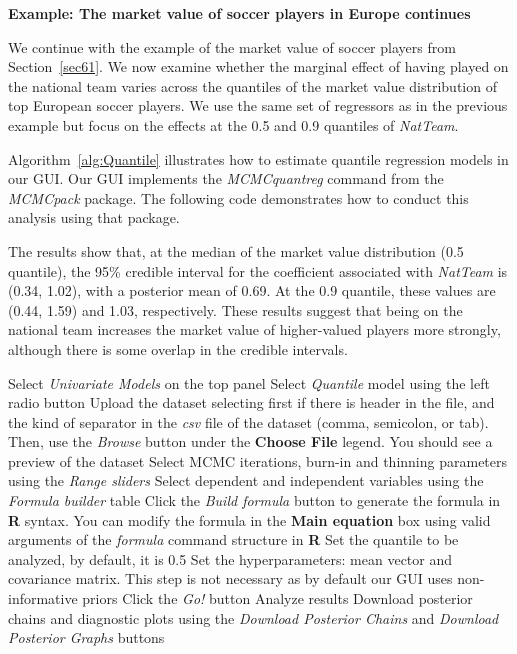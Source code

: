 \textbf{Example: The market value of soccer players in Europe continues}

We continue with the example of the market value of soccer players from Section~\ref{sec61}. We now examine whether the marginal effect of having played on the national team varies across the quantiles of the market value distribution of top European soccer players. We use the same set of regressors as in the previous example but focus on the effects at the 0.5 and 0.9 quantiles of \textit{NatTeam}.

Algorithm~\ref{alg:Quantile} illustrates how to estimate quantile regression models in our GUI. Our GUI implements the \textit{MCMCquantreg} command from the \textit{MCMCpack} package. The following code demonstrates how to conduct this analysis using that package.

The results show that, at the median of the market value distribution (0.5 quantile), the 95\% credible interval for the coefficient associated with \textit{NatTeam} is (0.34, 1.02), with a posterior mean of 0.69. At the 0.9 quantile, these values are (0.44, 1.59) and 1.03, respectively. These results suggest that being on the national team increases the market value of higher-valued players more strongly, although there is some overlap in the credible intervals.

\begin{algorithm}[h!]
	\caption{Quantile regression}\label{alg:Quantile}
	\begin{algorithmic}[1]  		 			
		\State Select \textit{Univariate Models} on the top panel
		\State Select \textit{Quantile} model using the left radio button
		\State Upload the dataset selecting first if there is header in the file, and the kind of separator in the \textit{csv} file of the dataset (comma, semicolon, or tab). Then, use the \textit{Browse} button under the \textbf{Choose File} legend. You should see a preview of the dataset
		\State Select MCMC iterations, burn-in and thinning parameters using the \textit{Range sliders}
		\State Select dependent and independent variables using the \textit{Formula builder} table
		\State Click the \textit{Build formula} button to generate the formula in \textbf{R} syntax. You can modify the formula in the \textbf{Main equation} box using valid arguments of the \textit{formula} command structure in \textbf{R}
		\State Set the quantile to be analyzed, by default, it is 0.5
		\State Set the hyperparameters: mean vector and covariance matrix. This step is not necessary as by default our GUI uses non-informative priors
		\State Click the \textit{Go!} button
		\State Analyze results
		\State Download posterior chains and diagnostic plots using the \textit{Download Posterior Chains} and \textit{Download Posterior Graphs} buttons
	\end{algorithmic} 
\end{algorithm}


